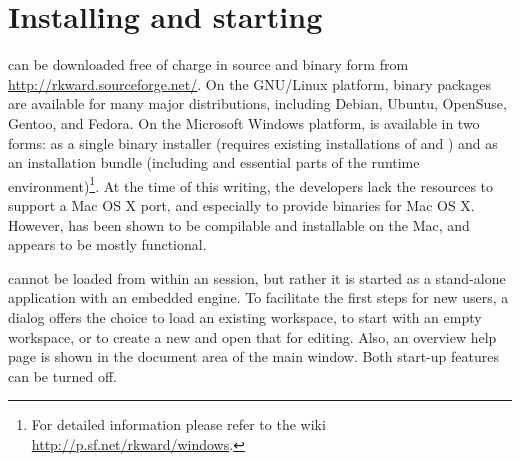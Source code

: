 \section[Installing and starting RKWard]{Installing and starting }
\label{sec:installing_starting_RKWard}
 can be downloaded free of charge in source and binary form from \url{http://rkward.sourceforge.net/}. 
On the GNU/Linux platform, binary packages are available for many major distributions,
including Debian, Ubuntu, OpenSuse, Gentoo, and Fedora. On the Microsoft Windows
platform,  is available in two forms: as a single binary
installer (requires existing installations of
 and ) and
as an installation bundle (including  and
essential parts of the  runtime environment)\footnote{For detailed information please refer to the 
 wiki \url{http://p.sf.net/rkward/windows}.}. At the time of
this writing, the developers lack the resources to support a Mac OS X
port, and especially to provide binaries for Mac OS X. However, 
has been shown to be compilable and installable on the Mac, and appears
to be mostly functional.

 cannot be loaded from within an 
session, but rather it is started as a stand-alone application with an
embedded  engine. To facilitate the first
steps for new users, a dialog offers the choice to load an existing
workspace, to start with an empty workspace, or to create a new
 and open that for editing. Also, an overview help page is
shown in the document area of the main window. Both start-up features
can be turned off.
